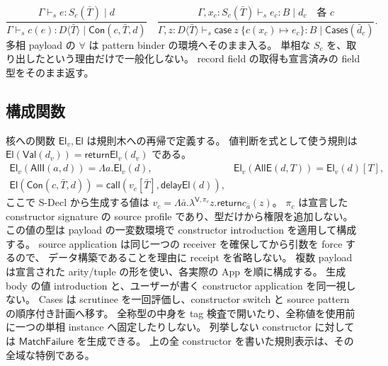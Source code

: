 \documentclass[11pt,a4paper]{article}
\newcommand{\Ret}{\mathsf{return}}
\newcommand{\Call}{\mathsf{call}}
\newcommand{\Delay}{\mathsf{delay}}
\newcommand{\El}{\mathsf{El}}
\begin{document}
\[
 \frac{\Gamma\vdash_s e:S_c(\bar T)\mid d}
      {\Gamma\vdash_s c(e):D\langle\bar T\rangle\mid\mathsf{Con}(c,\bar T,d)}
 \quad
 \frac{\Gamma,x_c:S_c(\bar T)\vdash_s e_c:B\mid d_c\quad\text{各 }c}
      {\Gamma,z:D\langle\bar T\rangle\vdash_s
           \mathsf{case}\ z\ \{c(x_c)\mapsto e_c\}:B\mid\mathsf{Cases}(\bar d_c)}.
\]
多相 payload の \(\forall\) は pattern binder の環境へそのまま入る。
単相な \(S_c\) を、取り出したという理由だけで一般化しない。
record field の取得も宣言済みの field 型をそのまま返す。

\subsection{構成関数}

核への関数 \(\El_v,\El\) は規則木への再帰で定義する。
値判断を式として使う規則は \(\El(\mathsf{Val}(d_v))=\Ret\El_v(d_v)\) である。
\[
\begin{array}{ll}
 \El_v(\mathsf{AllI}(a,d))=\Lambda a.\El_v(d),&
 \El_v(\mathsf{AllE}(d,T))=\El_v(d)[T],\\
 \El(\mathsf{Con}(c,\bar T,d))=
    \Call(v_c[\bar T],\Delay\El(d)),&
\end{array}
\]
ここで S-Decl から生成する値は
\(v_c=\Lambda\bar a.\lambda^{\mathsf V,\pi_c}z.\Ret c_{\bar a}(z)\)。
\(\pi_c\) は宣言した constructor signature の source profile であり、型だけから権限を追加しない。
この値の型は payload の一変数環境で constructor introduction を適用して構成する。
source application は同じ一つの receiver を確保してから引数を force するので、
データ構築であることを理由に receipt を省略しない。
複数 payload は宣言された arity/tuple の形を使い、各実際の App を順に構成する。
生成 body の値 introduction と、ユーザーが書く constructor application を同一視しない。
Cases は scrutinee を一回評価し、constructor switch と source pattern の順序付き計画へ移す。
全称型の中身を tag 検査で開いたり、全称値を使用前に一つの単相 instance へ固定したりしない。
列挙しない constructor に対しては \(\mathsf{MatchFailure}\) を生成できる。
上の全 constructor を書いた規則表示は、その全域な特例である。
\end{document}
